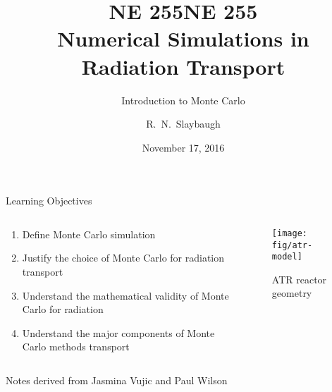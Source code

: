 \documentclass[xcolor=x11names,compress, handout]{beamer}
\title{NE 255}
\author{R.\ N.\ Slaybaugh}
\date{November 17, 2016}
\renewcommand{\(}{\begin{columns}}
\renewcommand{\)}{\end{columns}}
\newcommand{\<}[1]{\begin{column}{#1}}
\renewcommand{\>}{\end{column}}
\begin{document}
\begin{frame}
\title{NE 255\\Numerical Simulations in Radiation Transport}
\subtitle{Introduction to Monte Carlo}
\titlepage
\end{frame}

\begin{frame}{Learning Objectives}

\begin{columns}
  \begin{column}{0.5\textwidth}
    \begin{enumerate}
    \item Define Monte Carlo simulation
    \item Justify the choice of Monte Carlo for radiation transport
    \item Understand the mathematical validity of Monte Carlo for radiation
    \item Understand the major components of Monte Carlo methods transport
    \end{enumerate}
  \end{column}
  \begin{column}{0.5\textwidth}
  	\begin{figure}
  	\begin{center}
  		\texttt{[image: fig/atr-model]}
  		\caption{ATR reactor geometry}
	\end{center}
  	\end{figure}
  \end{column}
\end{columns}

Notes derived from Jasmina Vujic and Paul Wilson
\end{frame}

\end{document}
